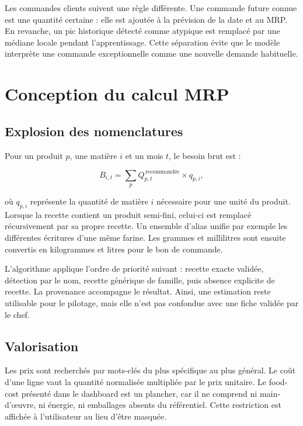 Les commandes clients suivent une règle différente. Une commande future connue
est une quantité certaine : elle est ajoutée à la prévision de la date et au MRP.
En revanche, un pic historique détecté comme atypique est remplacé par une médiane
locale pendant l'apprentissage. Cette séparation évite que le modèle interprète
une commande exceptionnelle comme une nouvelle demande habituelle.

\section{Conception du calcul MRP}

\subsection{Explosion des nomenclatures}

Pour un produit $p$, une matière $i$ et un mois $t$, le besoin brut est :

\begin{equation}
B_{i,t}=\sum_p Q^{\,\text{recommandée}}_{p,t}\times q_{p,i},
\end{equation}

où $q_{p,i}$ représente la quantité de matière $i$ nécessaire pour une unité du
produit. Lorsque la recette contient un produit semi-fini, celui-ci est remplacé
récursivement par sa propre recette. Un ensemble d'alias unifie par exemple les
différentes écritures d'une même farine. Les grammes et millilitres sont ensuite
convertis en kilogrammes et litres pour le bon de commande.

L'algorithme applique l'ordre de priorité suivant : recette exacte validée,
détection par le nom, recette générique de famille, puis absence explicite de
recette. La provenance accompagne le résultat. Ainsi, une estimation reste
utilisable pour le pilotage, mais elle n'est pas confondue avec une fiche validée
par le chef.

\subsection{Valorisation}

Les prix sont recherchés par mots-clés du plus spécifique au plus général. Le coût
d'une ligne vaut la quantité normalisée multipliée par le prix unitaire. Le
food-cost présenté dans le dashboard est un plancher, car il ne comprend ni
main-d'œuvre, ni énergie, ni emballages absents du référentiel. Cette restriction
est affichée à l'utilisateur au lieu d'être masquée.

